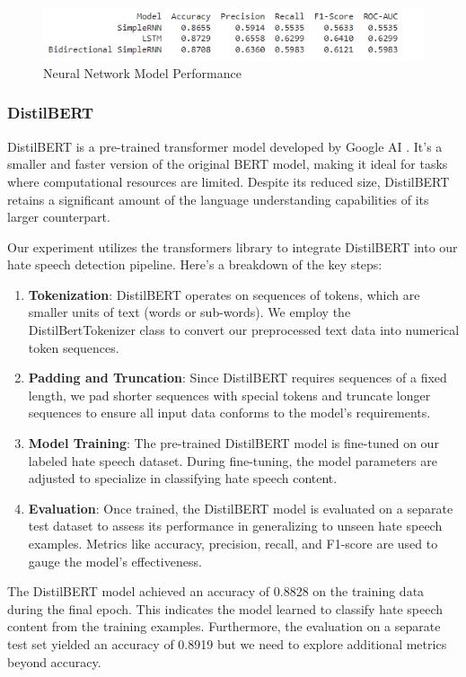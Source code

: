 \documentclass{article}
\begin{document}
\begin{figure}[H]
    \centering
    \includegraphics[width=\linewidth]{figure5.png}
    \caption{Neural Network Model Performance}
    \label{fig:nn_performance}
\end{figure}


\subsubsection*{DistilBERT}
DistilBERT is a pre-trained transformer model developed by Google AI \cite{distilbert}. It's a smaller and faster version of the original BERT model, making it ideal for tasks where computational resources are limited. Despite its reduced size, DistilBERT retains a significant amount of the language understanding capabilities of its larger counterpart.

Our experiment utilizes the transformers library to integrate DistilBERT into our hate speech detection pipeline. Here's a breakdown of the key steps:

\begin{enumerate}

    \item \textbf{Tokenization}: DistilBERT operates on sequences of tokens, which are smaller units of text (words or sub-words). We employ the DistilBertTokenizer class to convert our preprocessed text data into numerical token sequences.
    
    \item \textbf{Padding and Truncation}: Since DistilBERT requires sequences of a fixed length, we pad shorter sequences with special tokens and truncate longer sequences to ensure all input data conforms to the model's requirements.
    
    \item \textbf{Model Training}: The pre-trained DistilBERT model is fine-tuned on our labeled hate speech dataset. During fine-tuning, the model parameters are adjusted to specialize in classifying hate speech content.
    
    \item \textbf{Evaluation}: Once trained, the DistilBERT model is evaluated on a separate test dataset to assess its performance in generalizing to unseen hate speech examples. Metrics like accuracy, precision, recall, and F1-score are used to gauge the model's effectiveness.
\end{enumerate}
The DistilBERT model achieved an accuracy of 0.8828 on the training data during the final epoch. This indicates the model learned to classify hate speech content from the training examples. Furthermore, the evaluation on a separate test set yielded an accuracy of 0.8919 but we need to explore additional metrics beyond accuracy.
\end{document}
